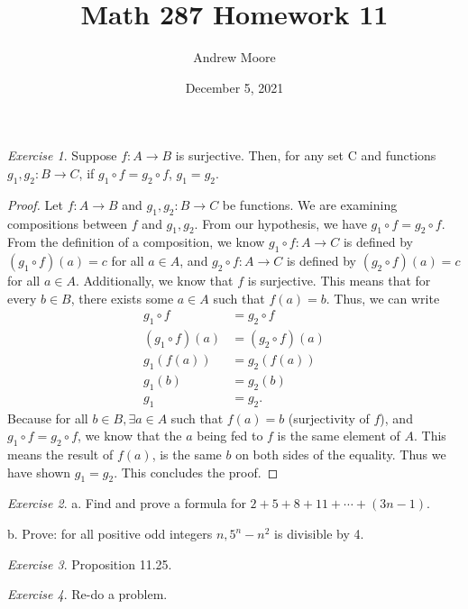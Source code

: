 \documentclass[12pt,oneside]{amsart}
\title{Math 287 Homework 11}
\author{Andrew Moore}
\date{December 5, 2021} %
\theoremstyle{remark}
\newtheorem{exer}{Exercise}
\begin{document}
\maketitle

\begin{exer}
Suppose $f: A \to B$ is surjective. Then, for any set C and functions $g_1, g_2 : B \to C$, if $g_1 \circ f = g_2 \circ f$, $g_1 = g_2$.
\end{exer}

\begin{proof}
Let $f: A \to B$ and $g_1, g_2 : B \to C$ be functions. We are examining compositions between $f$ and $g_1, g_2$. From our hypothesis, we have $g_1 \circ f = g_2 \circ f$. From the definition of a composition, we know $g_1 \circ f: A \to C$ is defined by $(g_1 \circ f)(a) = c$ for all $a \in A$, and $g_2 \circ f: A \to C$ is defined by $(g_2 \circ f)(a) = c$ for all $a \in A$. Additionally, we know that $f$ is surjective. This means that for every $b \in B$, there exists some $a \in A$ such that $f(a) = b$. Thus, we can write
\begin{align*}
     g_1 \circ f &= g_2 \circ f \tag{starting assumption} \\
(g_1 \circ f)(a) &= (g_2 \circ f)(a) \\
       g_1(f(a)) &= g_2(f(a)) \tag{definition of a composition} \\
          g_1(b) &= g_2(b) \\
             g_1 &= g_2.
\end{align*}
Because for all $b \in B, \exists a \in A$ such that $f(a) = b$ (surjectivity of $f$), and $g_1 \circ f = g_2 \circ f$, we know that the $a$ being fed to $f$ is the same element of $A$. This means the result of $f(a)$, is the same $b$ on both sides of the equality. Thus we have shown $g_1 = g_2$. This concludes the proof.
\end{proof}

\newpage
\begin{exer}
a. Find and prove a formula for $2 + 5 + 8 + 11 + \cdots + (3n - 1)$.

b. Prove: for all positive odd integers $n, 5^n - n^2$ is divisible by 4.
\end{exer}

\newpage
\begin{exer}
Proposition 11.25.
\end{exer}

\newpage
\begin{exer}
Re-do a problem.
\end{exer}
\end{document}
